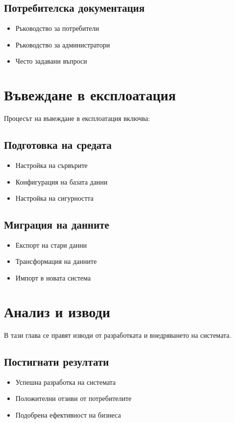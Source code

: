\documentclass[12pt,a4paper]{article}
\begin{document}
\subsection{Потребителска документация}
\begin{itemize}
    \item Ръководство за потребители
    \item Ръководство за администратори
    \item Често задавани въпроси
\end{itemize}

\section{Въвеждане в експлоатация}
Процесът на въвеждане в експлоатация включва:

\subsection{Подготовка на средата}
\begin{itemize}
    \item Настройка на сървърите
    \item Конфигурация на базата данни
    \item Настройка на сигурността
\end{itemize}

\subsection{Миграция на данните}
\begin{itemize}
    \item Експорт на стари данни
    \item Трансформация на данните
    \item Импорт в новата система
\end{itemize}

\section{Анализ и изводи}
В тази глава се правят изводи от разработката и внедряването на системата.

\subsection{Постигнати резултати}
\begin{itemize}
    \item Успешна разработка на системата
    \item Положителни отзиви от потребителите
    \item Подобрена ефективност на бизнеса
\end{itemize}
\end{document}
